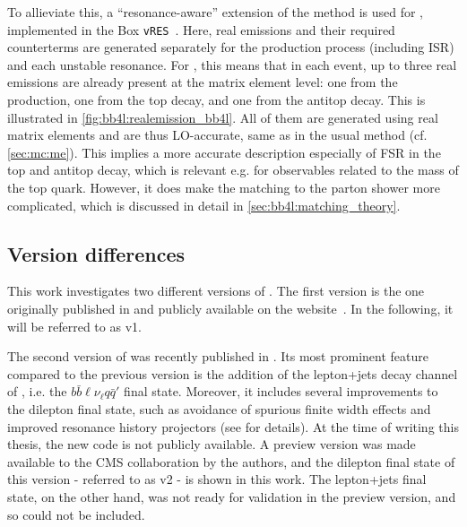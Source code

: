 To allieviate this, a ``resonance-aware'' extension of the \powheg method is used for \bbfourl, implemented in the \powheg Box \texttt{vRES}~\cite{Jezo:2015aia}. Here, real emissions and their required counterterms are generated separately for the production process (including ISR) and each unstable resonance. For \bbfourl, this means that in each event, up to three real emissions are already present at the matrix element level: one from the production, one from the top decay, and one from the antitop decay. This is illustrated in \cref{fig:bb4l:realemission_bb4l}. All of them are generated using real matrix elements and are thus LO-accurate, same as in the usual \powheg method (cf. \cref{sec:mc:me}). This implies a more accurate description especially of FSR in the top and antitop decay, which is relevant e.g. for observables related to the mass of the top quark. However, it does make the matching to the parton shower more complicated, which is discussed in detail in \cref{sec:bb4l:matching_theory}.


\subsection{Version differences}

This work investigates two different versions of \bbfourl. The first version is the one originally published in  and publicly available on the \powheg website~\cite{Powheg:website}. In the following, it will be referred to as \bbfourl v1.

The second version of \bbfourl was recently published in . Its most prominent feature compared to the previous version is the addition of the lepton+jets decay channel of \ttbar, i.e. the $b \bar{b} \ell \nu_{\ell} q \bar{q}'$ final state. Moreover, it includes several improvements to the dilepton final state, such as avoidance of spurious finite width effects and improved resonance history projectors (see  for details). At the time of writing this thesis, the new code is not publicly available. A preview version was made available to the CMS collaboration by the authors, and the dilepton final state of this version - referred to as \bbfourl v2 - is shown in this work. The lepton+jets final state, on the other hand, was not ready for validation in the preview version, and so could not be included.

